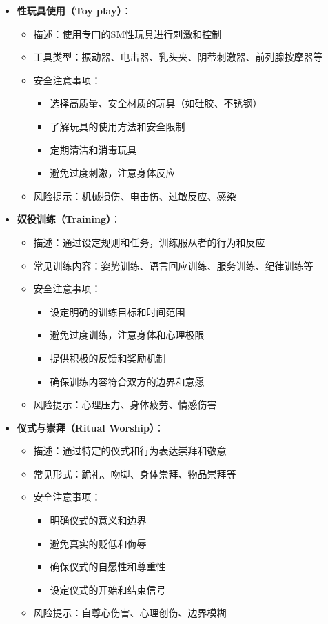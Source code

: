 \documentclass[12pt,UTF8]{ctexbook}
\begin{document}
\begin{itemize}
  \item \textbf{性玩具使用（Toy play）}：
    \begin{itemize}
    \item 描述：使用专门的SM性玩具进行刺激和控制
    \item 工具类型：振动器、电击器、乳头夹、阴蒂刺激器、前列腺按摩器等
    \item 安全注意事项：
      \begin{itemize}
      \item 选择高质量、安全材质的玩具（如硅胶、不锈钢）
      \item 了解玩具的使用方法和安全限制
      \item 定期清洁和消毒玩具
      \item 避免过度刺激，注意身体反应
      \end{itemize}
    \item 风险提示：机械损伤、电击伤、过敏反应、感染
    \end{itemize}
  \item \textbf{奴役训练（Training）}：
    \begin{itemize}
    \item 描述：通过设定规则和任务，训练服从者的行为和反应
    \item 常见训练内容：姿势训练、语言回应训练、服务训练、纪律训练等
    \item 安全注意事项：
      \begin{itemize}
      \item 设定明确的训练目标和时间范围
      \item 避免过度训练，注意身体和心理极限
      \item 提供积极的反馈和奖励机制
      \item 确保训练内容符合双方的边界和意愿
      \end{itemize}
    \item 风险提示：心理压力、身体疲劳、情感伤害
    \end{itemize}
  \item \textbf{仪式与崇拜（Ritual  Worship）}：
    \begin{itemize}
    \item 描述：通过特定的仪式和行为表达崇拜和敬意
    \item 常见形式：跪礼、吻脚、身体崇拜、物品崇拜等
    \item 安全注意事项：
      \begin{itemize}
      \item 明确仪式的意义和边界
      \item 避免真实的贬低和侮辱
      \item 确保仪式的自愿性和尊重性
      \item 设定仪式的开始和结束信号
      \end{itemize}
    \item 风险提示：自尊心伤害、心理创伤、边界模糊
    \end{itemize}
  \end{itemize}
\end{document}
